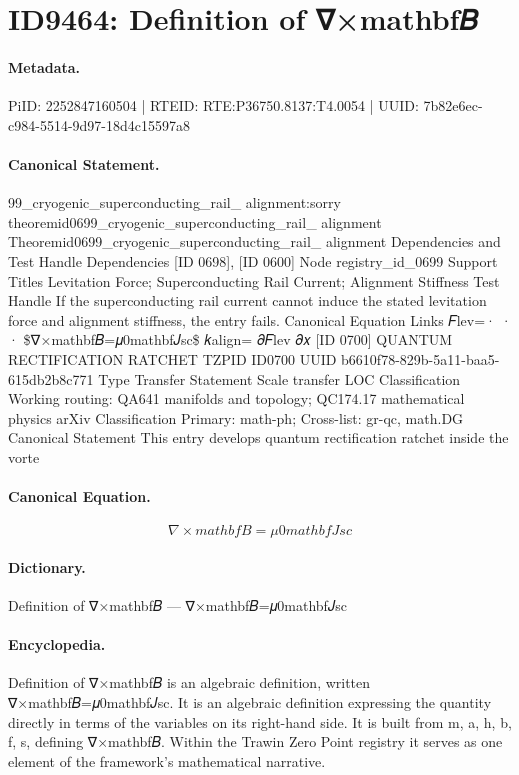 \section*{ID9464: Definition of ∇×mathbf𝐵}
\paragraph{Metadata.}
PiID: 2252847160504 | RTEID: RTE:P36750.8137:T4.0054 | UUID: 7b82e6ec-c984-5514-9d97-18d4c15597a8

\paragraph{Canonical Statement.}
99\_cryogenic\_superconducting\_rail\_ alignment:sorry theoremid0699\_cryogenic\_superconducting\_rail\_ alignment Theoremid0699\_cryogenic\_superconducting\_rail\_ alignment Dependencies and Test Handle Dependencies [ID 0698], [ID 0600] Node registry\_id\_0699 Support Titles Levitation Force; Superconducting Rail Current; Alignment Stiffness Test Handle If the superconducting rail current cannot induce the stated levitation force and alignment stiffness, the entry fails. Canonical Equation Links 𝐹lev=· · · \$∇×mathbf𝐵=𝜇0mathbf𝐽sc\$ 𝑘align= 𝜕𝐹lev 𝜕𝑥 [ID 0700] QUANTUM RECTIFICATION RATCHET TZPID ID0700 UUID b6610f78-829b-5a11-baa5-615db2b8c771 Type Transfer Statement Scale transfer LOC Classification Working routing: QA641 manifolds and topology; QC174.17 mathematical physics arXiv Classification Primary: math-ph; Cross-list: gr-qc, math.DG Canonical Statement This entry develops quantum rectification ratchet inside the vorte

\paragraph{Canonical Equation.}
\[
∇×mathbf𝐵=𝜇0mathbf𝐽sc
\]

\paragraph{Dictionary.}
Definition of ∇×mathbf𝐵 — ∇×mathbf𝐵=𝜇0mathbf𝐽sc

\paragraph{Encyclopedia.}
Definition of ∇×mathbf𝐵 is an algebraic definition, written ∇×mathbf𝐵=𝜇0mathbf𝐽sc. It is an algebraic definition expressing the quantity directly in terms of the variables on its right-hand side. It is built from m, a, h, b, f, s, defining ∇×mathbf𝐵. Within the Trawin Zero Point registry it serves as one element of the framework's mathematical narrative.
